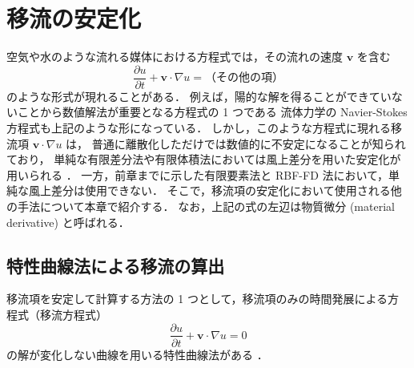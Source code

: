 %

\chapter{移流の安定化}\label{chap:pde_advection}

空気や水のような流れる媒体における方程式では，その流れの速度 $\bm{v}$ を含む
\begin{equation}
    \frac{\partial u}{\partial t} + \bm{v} \cdot \nabla u = \text{（その他の項）}
\end{equation}
のような形式が現れることがある．
例えば，陽的な解を得ることができていないことから数値解法が重要となる方程式の 1 つである
流体力学の Navier-Stokes 方程式も上記のような形になっている．
しかし，このような方程式に現れる移流項 $\bm{v} \cdot \nabla u$ は，
普通に離散化しただけでは数値的に不安定になることが知られており，
単純な有限差分法や有限体積法においては風上差分を用いた安定化が用いられる \cite{Tabata1994,Arakawa1994}．
一方，前章までに示した有限要素法と RBF-FD 法において，単純な風上差分は使用できない．
そこで，移流項の安定化において使用される他の手法について本章で紹介する．
なお，上記の式の左辺は物質微分 (material derivative) と呼ばれる．

\section{特性曲線法による移流の算出}\label{sec:pde_advection_characteristics}

移流項を安定して計算する方法の 1 つとして，移流項のみの時間発展による方程式（移流方程式）
\begin{equation}
    \frac{\partial u}{\partial t} + \bm{v} \cdot \nabla u = 0
\end{equation}
の解が変化しない曲線を用いる特性曲線法がある \cite{Knabner2003}．

